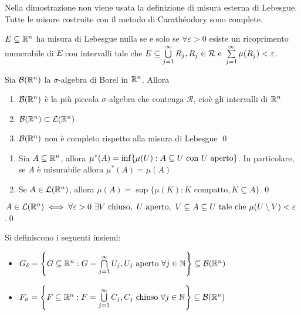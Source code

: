 \begin{remark}
	Nella dimostrazione non viene usata la definizione di misura esterna di Lebesgue. Tutte le misure costruite con il metodo di Carathéodory sono complete.
\end{remark}

\begin{definition}
	$E \subseteq \mathbb{R}^n$ ha misura di Lebesgue nulla se e solo se $\forall \varepsilon > 0$ esiste un ricoprimento numerabile di $E$ con intervalli tale che $E \subseteq \bigcup\limits_{j=1}^\infty R_j, R_j \in \mathcal{R} \text{ e } \sum\limits_{j=1}^\infty \mu(R_j)<\varepsilon$.
\end{definition}

\begin{theorem}
	Sia $\mathcal{B}(\mathbb{R}^n)$ la $\sigma$-algebra di Borel in $\mathbb{R}^n$. Allora
	\begin{enumerate}
		\item $\mathcal{B}(\mathbb{R}^n)$ è la più piccola $\sigma$-algebra che contenga $\mathcal{R}$, cioè gli intervalli di $\mathbb{R}^n$
		\item $\mathcal{B}(\mathbb{R}^n)\subset \mathcal{L}(\mathbb{R}^n)$
		\item $\mathcal{B}(\mathbb{R}^n)$ non è completo rispetto alla misura di Lebesgue
		\qed
	\end{enumerate}
\end{theorem}

\begin{theorem}
	\leavevmode
	\begin{enumerate}
		\item Sia $A\subseteq\mathbb{R}^n$, allora $\mu^*(A)=\inf\{\mu(U):A\subseteq U \text{ con } U \text{ aperto}\}$. In particolare, se $A$ è misurabile allora $\mu^*(A)=\mu(A)$
		\item Se $A \in \mathcal{L}(\mathbb{R}^n)$, allora $\mu(A)=\sup\{\mu(K):K \text{ compatto}, K \subseteq A\}$
		\qed
	\end{enumerate}
\end{theorem}

\begin{corollary}
	$A \in \mathcal{L}(\mathbb{R}^n) \iff \forall \varepsilon > 0 \ \exists V \text{ chiuso},\ U \text{ aperto},\ V \subseteq A \subseteq U \text{ tale che } \mu(U\setminus V) < \varepsilon$.\qed
\end{corollary}

\begin{definition}
	Si definiscono i seguenti insiemi:
	\begin{itemize}
		\item $G_\delta = \left\{G \subseteq \mathbb{R}^n:G=\bigcap\limits_{j=1}^\infty U_j, U_j \text{ aperto } \forall j \in \mathbb{N}\right\} \subseteq \mathcal{B}(\mathbb{R}^n)$
		\item $F_\sigma = \left\{F \subseteq \mathbb{R}^n:F=\bigcup\limits_{j=1}^\infty C_j, C_j \text{ chiuso } \forall j \in \mathbb{N}\right\} \subseteq \mathcal{B}(\mathbb{R}^n)$
	\end{itemize}
\end{definition}

